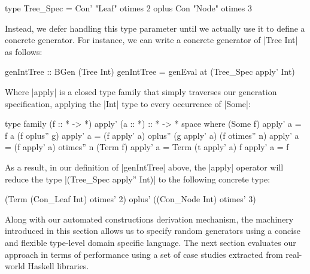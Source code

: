 \begin{code}
type Tree_Spec
  =      Con'  "Leaf"  otimes 2
  oplus  Con   "Node"  otimes 3
\end{code}

Instead, we defer handling this type parameter until we actually use it to
define a concrete generator.
%
For instance, we can write a concrete generator of |Tree Int| as follows:

\begin{code}
genIntTree :: BGen (Tree Int)
genIntTree = genEval at (Tree_Spec apply' Int)
\end{code}

Where |apply| is a closed type family that simply traverses our generation
specification, applying the |Int| type to every occurrence of |Some|:

\begin{code}
type family (f :: * -> *) apply' (a :: *) :: * -> * space where
  (Some f)         apply'  a  = f a
  (f oplus''  g)   apply'  a  = (f apply' a) oplus'' (g apply' a)
  (f otimes'' n)   apply'  a  = (f apply' a) otimes'' n
  (Term f)         apply'  a  = Term (t apply' a)
  f                apply'  a  = f
\end{code}

As a result, in our definition of |genIntTree| above, the |apply| operator will
reduce the type |(Tree_Spec apply'' Int)| to the following concrete type:

\begin{code}
(Term (Con_Leaf Int) otimes' 2) oplus' ((Con_Node Int) otimes' 3)
\end{code}


Along with our automated constructions derivation mechanism, the machinery
introduced in this section allows us to specify random generators using a
concise and flexible type-level domain specific language.
%
The next section evaluates our approach in terms of performance using a set of
case studies extracted from real-world Haskell libraries.
